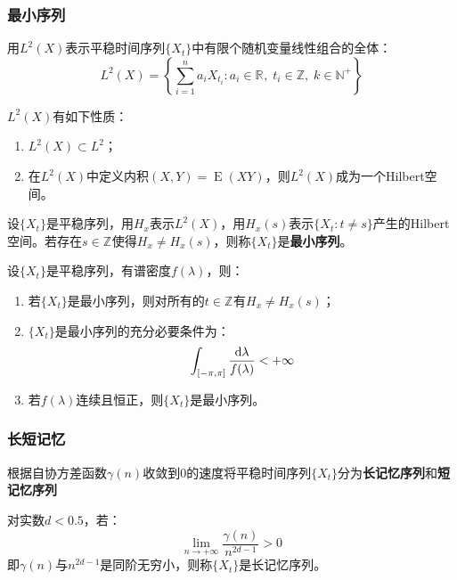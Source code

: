 \subsubsection{最小序列}
\begin{definition}
	用$L^2(X)$表示平稳时间序列$\{X_t\}$中有限个随机变量线性组合的全体：
	\begin{equation*}
		L^2(X)=\left\{\sum_{i=1}^{n}a_iX_{t_i}:a_i\in\mathbb{R}^{},\;t_i\in\mathbb{Z},\;k\in\mathbb{N}^+\right\}
	\end{equation*}
\end{definition}
\begin{property}\label{prop:L2TSX}
	$L^2(X)$有如下性质：
	\begin{enumerate}
		\item $L^2(X)\subset L^2$；
		\item 在$L^2(X)$中定义内积$(X,Y)=\operatorname{E}(XY)$，则$L^2(X)$成为一个Hilbert空间。
	\end{enumerate}
\end{property}
\begin{definition}
	设$\{X_t\}$是平稳序列，用$H_x$表示$L^2(X)$，用$H_x(s)$表示$\{X_t:t\ne s\}$产生的Hilbert空间。若存在$s\in\mathbb{Z}^{}$使得$H_x\ne H_x(s)$，则称$\{X_t\}$是\textbf{最小序列}。
\end{definition}
\begin{property}
	设$\{X_t\}$是平稳序列，有谱密度$f(\lambda)$，则：
	\begin{enumerate}
		\item 若$\{X_t\}$是最小序列，则对所有的$t\in\mathbb{Z}^{}$有$H_x\ne H_x(s)$；
		\item $\{X_t\}$是最小序列的充分必要条件为：
		\begin{equation*}
			\int_{[-\pi,\pi]}\frac{\mathop{}\!\mathrm{d}\lambda}{f(\lambda)}<+\infty
		\end{equation*}
		\item 若$f(\lambda)$连续且恒正，则$\{X_t\}$是最小序列。
	\end{enumerate}
\end{property}
\subsubsection{长短记忆}
\begin{definition}
	根据自协方差函数$\gamma(n)$收敛到$0$的速度将平稳时间序列$\{X_t\}$分为\textbf{长记忆序列}和\textbf{短记忆序列}\par
	对实数$d<0.5$，若：
	\begin{equation*}
		\lim_{n\to+\infty}\frac{\gamma(n)}{n^{2d-1}}>0
	\end{equation*}
	即$\gamma(n)$与$n^{2d-1}$是同阶无穷小，则称$\{X_t\}$是长记忆序列。
\end{definition}

